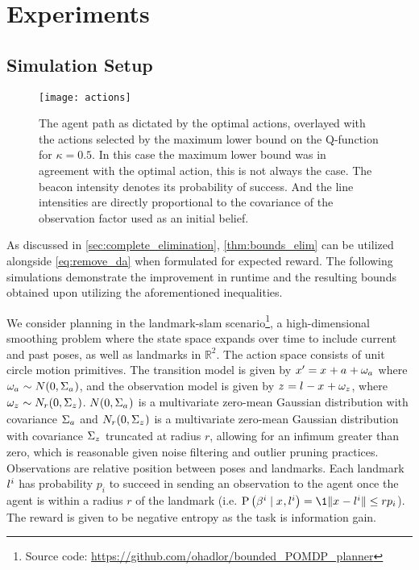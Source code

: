 \chapter{Experiments}
\section{Simulation Setup}
\begin{figure}[h]
	\centering
	\texttt{[image: actions]}
	\caption{The agent path as dictated by the optimal actions, overlayed with the actions selected by the maximum lower bound on the Q-function for $\kappa=0.5$. In this case the maximum lower bound was in agreement with the optimal action, this is not always the case. The beacon intensity denotes its probability of success. And the line intensities are directly proportional to the covariance of the observation factor used as an initial belief.}
	\label{fig:actions}
\end{figure}
As discussed in \cref{sec:complete_elimination}, \autoref{thm:bounds_elim} can be utilized alongside \eqref{eq:remove_da} when formulated for expected reward. The following simulations demonstrate the improvement in runtime and the resulting bounds obtained upon utilizing the aforementioned inequalities.

We consider planning in the landmark-\gls{slam} scenario\footnote{Source code: \url{https://github.com/ohadlor/bounded_POMDP_planner}}, a high-dimensional smoothing problem where the state space expands over time to include current and past poses, as well as landmarks in $\mathbb{R}^2$. The action space consists of unit circle motion primitives. The transition model is given by $x_{}^\prime=x_{}+{a_{}}+\omega_{{a_{}}}$ where $\omega_{{a_{}}}\sim N(0,\Sigma_{{a_{}}})$, and the observation model is given by $z_{}^{}=l^{}-x_{}+\omega_{z_{}^{}}$, where $\omega_{z_{}^{}}\sim N_r(0,\Sigma_{z_{}^{}})$.  $N(0,\Sigma_{{a_{}}})$ is a multivariate zero-mean Gaussian distribution with covariance $\Sigma_{{a_{}}}$ and $N_r(0,\Sigma_{z_{}^{}})$ is a multivariate zero-mean Gaussian distribution with covariance $\Sigma_{z_{}^{}}$ truncated at radius $r$, allowing for an infimum greater than zero, which is reasonable given noise filtering and outlier pruning practices. Observations are relative position between poses and landmarks. Each landmark $l^{i}$ has probability $p_i$ to succeed in sending an observation to the agent once the agent is within a radius $r$ of the landmark (i.e. $\probcond{\da{}{i}}{\state{},\landmark{i}}=\1{\norm{\state{}-\landmark{i}}\leq r}p_i$). The reward is given to be negative entropy as the task is information gain.

